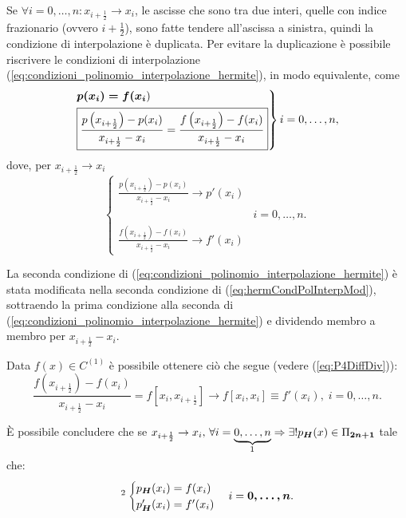 Se $\forall i=0,\hdots,n: x_{i+\frac{1}{2}}\rightarrow x_i$, le ascisse che sono tra due interi, quelle con indice frazionario (ovvero $i+\frac{1}{2}$), sono fatte tendere all'ascissa a sinistra, quindi la condizione di interpolazione è duplicata. Per evitare la duplicazione è possibile riscrivere le condizioni di interpolazione (\ref{eq:condizioni_polinomio_interpolazione_hermite}), in modo equivalente, come
\begin{equation}\label{eq:hermCondPolInterpMod}
    \begin{rcases}
        \boldsymbol{p(x_i)=f(x_i})\\
        \boxed{\frac{p\left(x_{i+\frac{1}{2}}\right)-p(x_i)}{x_{i+\frac{1}{2}}-x_i}=\frac{f\left(x_{i+\frac{1}{2}}\right)-f(x_i)}{x_{i+\frac{1}{2}}-x_i}}
     \end{rcases} i=0,\hdots,n,
\end{equation}
dove, per $x_{i+\frac{1}{2}}\rightarrow x_i$
\begin{equation*}
    \begin{cases}
        \frac{p\left(x_{i+\frac{1}{2}}\right)-p(x_i)}{x_{i+\frac{1}{2}}-x_i}\rightarrow p'(x_i)\\
        & i=0,\hdots, n.\\
        \frac{f\left(x_{i+\frac{1}{2}}\right)-f(x_i)}{x_{i+\frac{1}{2}}-x_i}\rightarrow f'(x_i)
    \end{cases}
\end{equation*}

\begin{remark}
    La seconda condizione di (\ref{eq:condizioni_polinomio_interpolazione_hermite}) è stata modificata nella seconda condizione di (\ref{eq:hermCondPolInterpMod}), sottraendo la prima condizione alla seconda di (\ref{eq:condizioni_polinomio_interpolazione_hermite}) e dividendo membro a membro per $x_{i+\frac{1}{2}}-x_i$.
\end{remark}

Data $f(x)\in C^{(1)}$ è possibile ottenere ciò che segue (vedere (\ref{eq:P4DiffDiv})):
\begin{equation}\label{eq:equivApproxf'}
    \frac{f\left(x_{i+\frac{1}{2}}\right)-f(x_i)}{x_{i+\frac{1}{2}}-x_i}=f\left[x_i,x_{i+\frac{1}{2}}\right]\rightarrow f[x_i,x_i]\equiv f'(x_i),\; i=0,\hdots,n.
\end{equation}

È possibile concludere che se $x_{i+\frac{1}{2}}\rightarrow x_i,\, \forall i=\underbrace{0,\hdots, n}_{\footnotemark}\Rightarrow\exists! p_{\boldsymbol H}(x)\in\Pi_{\boldsymbol{2n+1}}$ tale che: 
\begin{equation}\label{eq:polInterHer}
    \footnotemark\begin{cases}
        p_{\boldsymbol H}(x_i)=f(x_i)\\
        p_{\boldsymbol H}'(x_i)=f'(x_i)
    \end{cases} i=\boldsymbol{0,\hdots,n}.
\end{equation}

